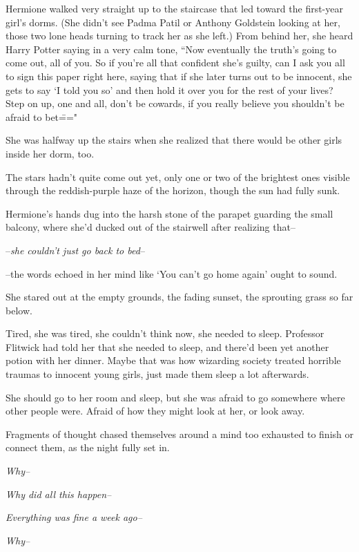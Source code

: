 Hermione walked very straight up to the staircase that led toward the first-year girl's dorms. (She didn't see Padma Patil or Anthony Goldstein looking at her, those two lone heads turning to track her as she left.) From behind her, she heard Harry Potter saying in a very calm tone, ``Now eventually the truth's going to come out, all of you. So if you're all that confident she's guilty, can I ask you all to sign this paper right here, saying that if she later turns out to be innocent, she gets to say `I told you so' and then hold it over you for the rest of your lives? Step on up, one and all, don't be cowards, if you really believe you shouldn't be afraid to bet\==="

She was halfway up the stairs when she realized that there would be other girls inside her dorm, too.

\later

The stars hadn't quite come out yet, only one or two of the brightest ones visible through the reddish-purple haze of the horizon, though the sun had fully sunk.

Hermione's hands dug into the harsh stone of the parapet guarding the small balcony, where she'd ducked out of the stairwell after realizing that\---

\---\emph{she couldn't just go back to bed}\---

\---the words echoed in her mind like `You can't go home again' ought to sound.

She stared out at the empty grounds, the fading sunset, the sprouting grass so far below.

Tired, she was tired, she couldn't think now, she needed to sleep. Professor Flitwick had told her that she needed to sleep, and there'd been yet another potion with her dinner. Maybe that was how wizarding society treated horrible traumas to innocent young girls, just made them sleep a lot afterwards.

She should go to her room and sleep, but she was afraid to go somewhere where other people were. Afraid of how they might look at her, or look away.

Fragments of thought chased themselves around a mind too exhausted to finish or connect them, as the night fully set in.

\emph{Why\---}

\emph{Why did all this happen\---}

\emph{Everything was fine a week ago\---}

\emph{Why\---}

